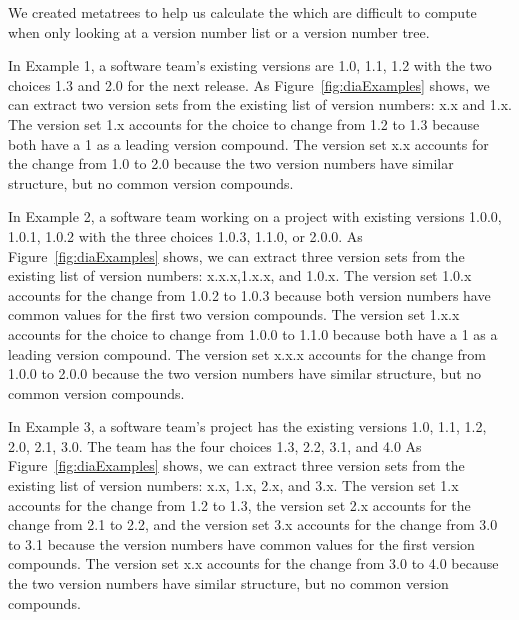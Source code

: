 \documentclass[conference]{IEEEtran}
\begin{document}

We  created metatrees to help us calculate the \numberchoices which are difficult to compute when only looking at a version number list or a version number tree.

In Example 1, a software team's existing versions are 1.0, 1.1, 1.2 with the two choices 1.3 and 2.0 for the next release. As Figure~\ref{fig:diaExamples} shows, we can extract two version sets from the existing list of version numbers: x.x and 1.x. The version set 1.x accounts for the choice to change from 1.2 to 1.3 because both have a 1 as a leading version compound. The version set x.x accounts for the change from 1.0 to 2.0 because the two version numbers have similar structure, but no common version compounds.



In Example 2, a software team working on a project with existing versions 1.0.0, 1.0.1, 1.0.2 with the three choices 1.0.3, 1.1.0, or 2.0.0. 
As Figure~\ref{fig:diaExamples} shows, we can extract three version sets from the existing list of version numbers: x.x.x,1.x.x, and 1.0.x. 
The version set 1.0.x accounts for the change from 1.0.2 to 1.0.3 because both version numbers have common values for the first two version compounds. 
The version set 1.x.x accounts for the choice to change from 1.0.0 to 1.1.0 because both have a 1 as a leading version compound. 
The version set x.x.x accounts for the change from 1.0.0 to 2.0.0 because the two version numbers have similar structure, but no common version compounds.



In Example 3, a software team's project has the existing versions 1.0, 1.1, 1.2, 2.0, 2.1, 3.0. The team has the four choices 1.3, 2.2, 3.1, and 4.0 
As Figure~\ref{fig:diaExamples} shows, we can extract three version sets from the existing list of version numbers: x.x, 1.x, 2.x, and 3.x. 
The version set 1.x accounts for the change from 1.2 to 1.3, the version set 2.x accounts for the change from 2.1 to 2.2, and the version set 3.x accounts for the change from 3.0 to 3.1 because the version numbers have common values for the first version compounds. 
The version set x.x accounts for the change from 3.0 to 4.0 because the two version numbers have similar structure, but no common version compounds.
\end{document}
